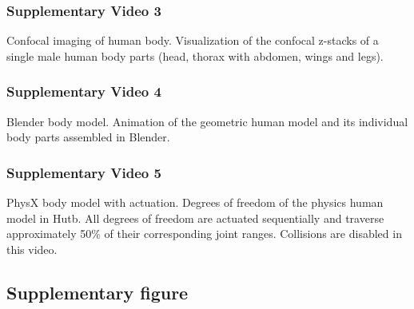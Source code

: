 \documentclass[sn-mathphys-num]{sn-jnl}%
\theoremstyle{thmstyleone}%
\theoremstyle{thmstyletwo}%
\theoremstyle{thmstylethree}%
\begin{document}
\begin{appendices}
\subsubsection{Supplementary Video 3} \label{sec:sup_2_1}

Confocal imaging of human body. 
Visualization of the confocal z-stacks of a single male human body parts (head, thorax with abdomen, wings and legs).


\subsubsection{Supplementary Video 4} \label{sec:sup_2_2}

Blender body model. 
Animation of the geometric human model and its individual body parts assembled in Blender.

\subsubsection{Supplementary Video 5} \label{sec:sup_2_3}

PhysX body model with actuation. 
Degrees of freedom of the physics human model in Hutb. 
All degrees of freedom are actuated sequentially and traverse approximately 50\% of their corresponding joint ranges. 
Collisions are disabled in this video.







\subsection{Supplementary figure}\label{secS1}











\end{appendices}
\end{document}
